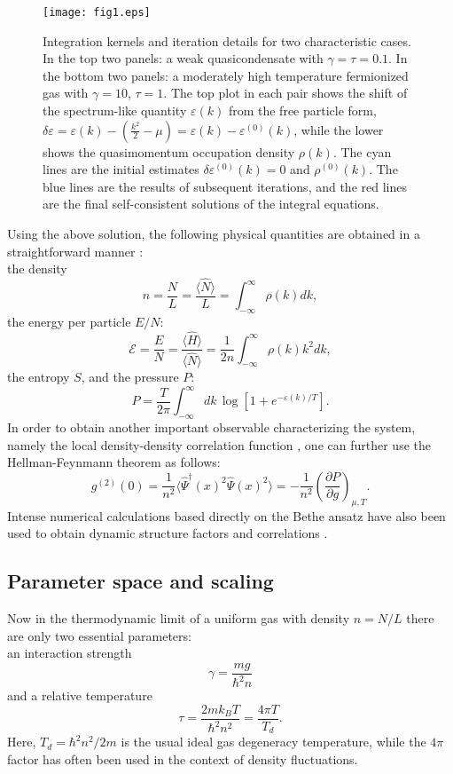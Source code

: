 \documentclass[aps,twocolumn,pra,superscriptaddress,nofootinbib,amsmath,amssymb,floats,floatfix,english]{revtex4-1}
\newcommand{\op}[1]{\widehat{#1}}
\newcommand{\dagop}[1]{\widehat{#1}^{\dagger}}
\newcommand{\mc}[1]{{\mathcal{#1}}}
\renewcommand{\eq}[2]{\begin{equation}\label{#1}#2\end{equation}}
\newcommand{\ve}{\varepsilon}
\begin{document}
\begin{figure}
\begin{center}
\texttt{[image: fig1.eps]}
\end{center}
\caption{
Integration kernels and iteration details for two characteristic cases. In the top two panels: a weak quasicondensate with $\gamma=\tau=0.1$. In the bottom two panels: a moderately high temperature fermionized gas with $\gamma=10$, $\tau=1$. 
The top plot in each pair shows the shift of the spectrum-like quantity $\ve(k)$ from the free particle form, $\delta\ve=\ve(k)-(\frac{k^2}{2}-\mu) = \ve(k)-\ve^{(0)}(k)$, while the lower shows the quasimomentum occupation density $\rho(k)$.
The cyan lines are the initial estimates $\delta\ve^{(0)}(k)=0$ and $\rho^{(0)}(k)$. The blue lines are the results of subsequent iterations, and the red lines are the final self-consistent solutions of the integral equations.
}
\label{fig:vars}
\end{figure}

Using the above solution, the following physical quantities are obtained in a straightforward manner \cite{Yang69}:\\
the density
\eq{nsol}{
n=\frac{N}{L} = \frac{\langle\op{N}\rangle}{L} = \int_{-\infty}^{\infty} \rho(k) dk,
}
the energy per particle $E/N$:\\
\eq{Esol}{
\mc{E}=\frac{E}{N}=\frac{\langle\op{H}\rangle}{\langle\op{N}\rangle} = \frac{1}{2n}\int_{-\infty}^{\infty} \rho(k) k^2 dk,
}
the entropy $S$, and the pressure $P$: \\
\eq{Psol}{
P= \frac{T}{2\pi}\int_{-\infty}^{\infty} dk\, \log\left[1+e^{-\ve(k)/T}\right].
}
In order to obtain another important observable characterizing the system, namely the local density-density correlation function \cite{Kheruntsyan03,Kheruntsyan05}, one can further use the  Hellman-Feynmann  theorem as follows:
\eq{g20sol}{
g^{(2)}(0) = \frac{1}{n^2}\langle\dagop{\Psi}(x)^2\op{\Psi}(x)^2\rangle = -\frac{1}{n^2}\left(\frac{\partial P}{\partial g}\right)_{\mu,T}.
}
Intense numerical calculations based directly on the Bethe ansatz have also been used to obtain dynamic structure factors and correlations \cite{Panfil13,Panfil14,deNardis16}.


\subsection{Parameter space and scaling} 
\label{GAMTAU}
Now in the thermodynamic limit of a uniform gas with density $n=N/L$ there are only two essential parameters:\\
an interaction strength
\eq{gam}{
\gamma = \frac{mg}{\hbar^2 n}
}
and a relative temperature 
\eq{tau}{
\tau = \frac{2mk_BT}{\hbar^2n^2} = \frac{4\pi T}{T_d}.
}
Here, $T_d=\hbar^2n^2/2m$ is the usual ideal gas degeneracy temperature, while the $4\pi$ factor has often been used in the context of density fluctuations.
\end{document}
